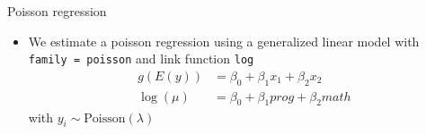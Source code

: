 \documentclass[aspectratio=169]{beamer}
\begin{document}
\begin{frame}{Poisson regression}
  \begin{itemize}
    \item We estimate a poisson regression using a generalized linear model
      with \texttt{family = poisson} and link function \texttt{log}
  \begin{align*}
    g(E(y)) & = \beta_0 + \beta_1 x_1 + \beta_2 x_2\\
    \log(\mu) & = \beta_0 + \beta_1 prog + \beta_2 math
  \end{align*}
  with $y_i \sim \text{Poisson}(\lambda)$
  \end{itemize}
\end{frame}
\end{document}
